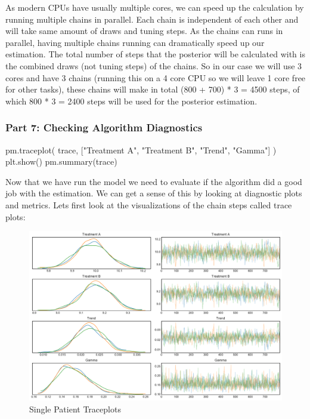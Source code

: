 \documentclass[12pt,a4paper,leqno]{report}
\theoremstyle{plain}
\theoremstyle{definition}
\theoremstyle{remark}
\begin{document}

As modern CPUs have usually multiple cores, we can speed up the calculation by running
multiple chains in parallel. Each chain is independent of each other and will
take same amount of draws and tuning steps. As the chains can runs in parallel, having
multiple chains running can dramatically speed up our estimation. The total number of steps that
the posterior will be calculated with is the combined draws (not tuning steps) of the
chains. So in our case we will use 3 cores and have 3 chains (running this on a 4 core
CPU so we will leave 1 core free for other tasks), these chains will make in total (800 +
700) * 3 = 4500 steps, of which 800 * 3 = 2400 steps will be used for the posterior estimation.

\subsubsection*{Part 7: Checking Algorithm Diagnostics}

\bigskip
\begin{pyverbatim}[][fontsize=\footnotesize]
    pm.traceplot(
            trace, ["Treatment A", "Treatment B", "Trend", "Gamma"]
        )
    plt.show()
    pm.summary(trace)
\end{pyverbatim}
\smallskip

Now that we have run the model we need to evaluate if the algorithm did a good job with
the estimation. We can get a sense of this by looking at diagnostic plots and metrics.
Lets first look at the visualizations of the chain steps called trace plots:

\begin{figure}[H]
    \caption{Single Patient Traceplots}\label{traceplots}
    \includegraphics[width=\textwidth,height=\textheight,keepaspectratio]{single_patient_traceplot.pdf}
\end{figure}
\end{document}
